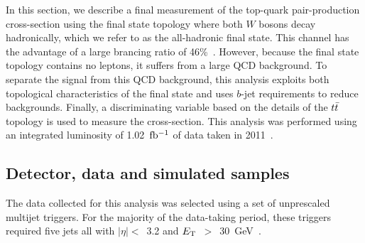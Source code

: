 
In this section, we describe a final measurement of the top-quark pair-production cross-section using the final state topology where both $W$ bosons decay hadronically, 
which we refer to as the all-hadronic final state.
This channel has the advantage of a large brancing ratio of 46\%~\cite{ref:PDG}.
However, because the final state topology contains no leptons, it suffers from a large QCD background.
To separate the signal from this QCD background, this analysis exploits both topological characteristics
of the final state and uses $b$-jet requirements to reduce backgrounds.
Finally, a discriminating variable based on the details of the $t\bar{t}$ topology is used to measure the cross-section.
This analysis was performed using an integrated luminosity of 1.02~$\mbox{fb$^{-1}$}$ of data taken in 2011~\cite{ref:ATLAS}.



\subsection{Detector, data and simulated samples}
\label{sec:datasample}


The data collected for this analysis was selected using a set of unprescaled multijet triggers.
For the majority of the data-taking period, these triggers required five jets all with 
$|\eta| <$~3.2 and $E_{\mathrm{T}}$~$>$~30~GeV~\cite{ref:JetTrigger}.

